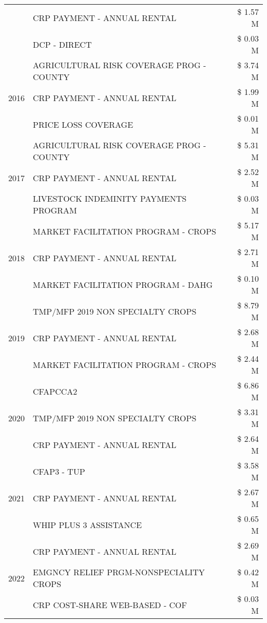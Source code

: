 \begin{tabular}{llr}
 & CRP PAYMENT - ANNUAL RENTAL & \$ 1.57 M \\
 & DCP - DIRECT & \$ 0.03 M \\
\cline{1-3}
\multirow[t]{3}{*}{2016} & AGRICULTURAL RISK COVERAGE PROG - COUNTY & \$ 3.74 M \\
 & CRP PAYMENT - ANNUAL RENTAL & \$ 1.99 M \\
 & PRICE LOSS COVERAGE & \$ 0.01 M \\
\cline{1-3}
\multirow[t]{3}{*}{2017} & AGRICULTURAL RISK COVERAGE PROG - COUNTY & \$ 5.31 M \\
 & CRP PAYMENT - ANNUAL RENTAL & \$ 2.52 M \\
 & LIVESTOCK INDEMINITY PAYMENTS PROGRAM & \$ 0.03 M \\
\cline{1-3}
\multirow[t]{3}{*}{2018} & MARKET FACILITATION PROGRAM - CROPS & \$ 5.17 M \\
 & CRP PAYMENT - ANNUAL RENTAL & \$ 2.71 M \\
 & MARKET FACILITATION PROGRAM - DAHG & \$ 0.10 M \\
\cline{1-3}
\multirow[t]{3}{*}{2019} & TMP/MFP 2019 NON SPECIALTY CROPS & \$ 8.79 M \\
 & CRP PAYMENT - ANNUAL RENTAL & \$ 2.68 M \\
 & MARKET FACILITATION PROGRAM - CROPS & \$ 2.44 M \\
\cline{1-3}
\multirow[t]{3}{*}{2020} & CFAPCCA2 & \$ 6.86 M \\
 & TMP/MFP 2019 NON SPECIALTY CROPS & \$ 3.31 M \\
 & CRP PAYMENT - ANNUAL RENTAL & \$ 2.64 M \\
\cline{1-3}
\multirow[t]{3}{*}{2021} & CFAP3 - TUP & \$ 3.58 M \\
 & CRP PAYMENT - ANNUAL RENTAL & \$ 2.67 M \\
 & WHIP PLUS 3 ASSISTANCE & \$ 0.65 M \\
\cline{1-3}
\multirow[t]{3}{*}{2022} & CRP PAYMENT - ANNUAL RENTAL & \$ 2.69 M \\
 & EMGNCY RELIEF PRGM-NONSPECIALITY CROPS & \$ 0.42 M \\
 & CRP COST-SHARE WEB-BASED - COF & \$ 0.03 M \\
\cline{1-3}
\bottomrule
\end{tabular}
